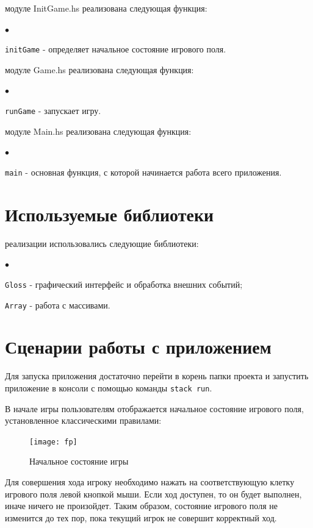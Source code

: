 \documentclass[oneside,final,14pt]{extreport}
\newenvironment{compactlist}{
    \begin{list}
    {{$\bullet$}}
    {
        \setlength\partopsep{0pt}
        \setlength\parskip{0pt}
        \setlength\parsep{5pt}
        \setlength\topsep{5pt}
        \setlength\itemsep{0pt}                        
    }
}{
    \end{list}
}
\begin{document}
\vspace{3mm}
 модуле InitGame.hs реализована следующая функция:
\begin{compactlist}
    \item {\tt initGame} - определяет начальное состояние игрового поля.
\end{compactlist}
\vspace{3mm}
 модуле Game.hs реализована следующая функция:
\begin{compactlist}
    \item {\tt runGame} - запускает игру.
\end{compactlist}
\vspace{3mm}
 модуле Main.hs реализована следующая функция:
\begin{compactlist}
    \item {\tt main} - основная функция, с которой начинается работа всего приложения.
\end{compactlist}
\newpage
\section {Используемые библиотеки}
 реализации использовались следующие библиотеки:
\begin{compactlist}
    \item {\tt Gloss} - графический интерфейс и обработка внешних событий;
    \item {\tt Array} - работа с массивами.
\end{compactlist}

\section {Сценарии работы с приложением}
Для запуска приложения достаточно перейти в корень папки проекта и запустить приложение в консоли с помощью команды {\tt stack run}.

В начале игры пользователям отображается начальное состояние игрового поля, установленное классическими правилами: 

\begin{figure}[h]
    \centering
    \texttt{[image: fp]}
    \caption{Начальное состояние игры}
    \label{fig:my_label}
\end{figure}
\newpage

Для совершения хода игроку необходимо нажать на соответствующую клетку игрового поля левой кнопкой мыши. Если ход доступен, то он будет выполнен, иначе ничего не произойдет. Таким образом, состояние игрового поля не изменится до тех пор, пока текущий игрок не совершит корректный ход. 
\end{document}
